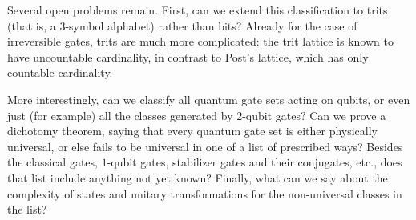 \documentclass[11pt]{report}
\theoremstyle{plain}
\theoremstyle{definition}
\begin{document}
Several open problems remain. First, can we extend this classification to trits (that is, a $3$-symbol alphabet) rather than bits? Already for the case of irreversible gates, trits are much more complicated: the trit lattice is known to have uncountable cardinality, in contrast to Post's lattice, which has only countable cardinality.

More interestingly, can we classify all quantum gate sets acting on qubits, or even just (for example) all the classes generated by $2$-qubit gates?  Can we prove a dichotomy theorem, saying that every quantum gate set is either physically universal, or else fails to be universal in one of a list of prescribed ways?  Besides the classical gates, $1$-qubit gates, stabilizer gates and their conjugates, etc., does that list include anything not yet known?  Finally, what can we say about the complexity of states and unitary transformations for the non-universal classes in the list?




\end{document}

